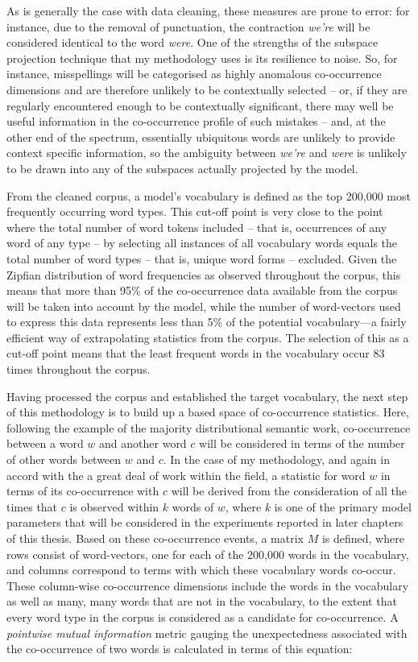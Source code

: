 As is generally the case with data cleaning, these measures are prone to error: for instance, due to the removal of punctuation, the contraction \emph{we're} will be considered identical to the word \emph{were}.  One of the strengths of the subspace projection technique that my methodology uses is its resilience to noise.  So, for instance, misspellings will be categorised as highly anomalous co-occurrence dimensions and are therefore unlikely to be contextually selected -- or, if they are regularly encountered enough to be contextually significant, there may well be useful information in the co-occurrence profile of such mistakes -- and, at the other end of the spectrum, essentially ubiquitous words are unlikely to provide context specific information, so the ambiguity between \emph{we're} and \emph{were} is unlikely to be drawn into any of the subspaces actually projected by the model.

From the cleaned corpus, a model's vocabulary is defined as the top 200,000 most frequently occurring word types.  This cut-off point is very close to the point where the total number of word tokens included -- that is, occurrences of any word of any type -- by selecting all instances of all vocabulary words equals the total number of word types -- that is, unique word forms -- excluded.  Given the Zipfian distribution of word frequencies as observed throughout the corpus, this means that more than 95\% of the co-occurrence data available from the corpus will be taken into account by the model, while the number of word-vectors used to express this data represents less than 5\% of the potential vocabulary---a fairly efficient way of extrapolating statistics from the corpus.  The selection of this as a cut-off point means that the least frequent words in the vocabulary occur 83 times throughout the corpus.

Having processed the corpus and established the target vocabulary, the next step of this methodology is to build up a based space of co-occurrence statistics.  Here, following the example of the majority distributional semantic work, co-occurrence between a word $w$ and another word $c$ will be considered in terms of the number of other words between $w$ and $c$.  In the case of my methodology, and again in accord with the a great deal of work within the field, a statistic for word $w$ in terms of its co-occurrence with $c$ will be derived from the consideration of all the times that $c$ is observed within $k$ words of $w$, where $k$ is one of the primary model parameters that will be considered in the experiments reported in later chapters of this thesis.  Based on these co-occurrence events, a matrix $M$ is defined, where rows consist of word-vectors, one for each of the 200,000 words in the vocabulary, and columns correspond to terms with which these vocabulary words co-occur.  These column-wise co-occurrence dimensions include the words in the vocabulary as well as many, many words that are not in the vocabulary, to the extent that every word type in the corpus is considered as a candidate for co-occurrence.  A \emph{pointwise mutual information} metric gauging the unexpectedness associated with the co-occurrence of two words is calculated in terms of this equation:

